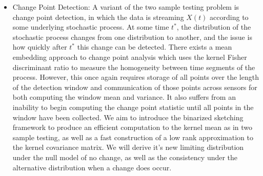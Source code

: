 \documentclass{article}
\newcommand{\comment}[3]{{\color{#1} {\bf #2 :} #3}}
\newcommand{\yoav}[1]{\comment{magenta}{Yoav}{#1}}
\begin{document}
\begin{itemize}

\item Change Point Detection: A variant of the two sample testing problem is change point detection, in which the data is streaming $X(t)$ according to some underlying stochastic process.  At some time $t^*$, the distribution of the stochastic process changes from one distribution to another, and the issue is how quickly after $t^*$ this change can be detected.   There exists a mean embedding approach to change point analysis \cite{Bach 2008} which uses the kernel Fisher discriminant ratio to measure the homogeneity between time segments of the process.  However, this once again requires storage of all points over the length of the detection window and communication of those points across sensors for both computing the window mean and variance. It also suffers from an inability to begin computing the change point statistic until all points in the window have been collected.  We aim to introduce the binarized sketching framework to produce an efficient computation to the kernel mean as in two sample testing, as well as a fast construction of a low rank approximation to the kernel covariance matrix.  We will derive it's new limiting distribution under the null model of no change, as well as the consistency under the alternative distribution when a change does occur.  


\end{itemize}
\end{document}

